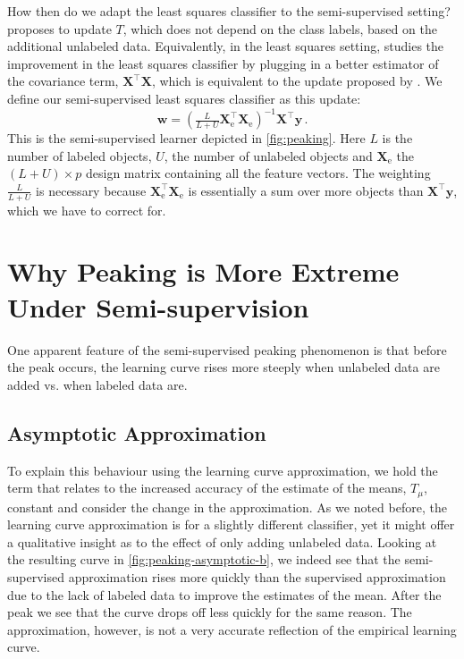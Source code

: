 \documentclass[twoside]{memoir}\usepackage[]{graphicx}\usepackage{xcolor}
\renewcommand{\vec}{\mathbf}
\begin{document}
How then do we adapt the least squares classifier to the semi-supervised setting? \citet{Fan2008} proposes to update $T$, which does not depend on the class labels, based on the additional unlabeled data. Equivalently, in the least squares setting, \citet{Shaffer1991} studies the improvement in the least squares classifier by plugging in a better estimator of the covariance term, $\mathbf{X}^\top \mathbf{X}$, which is equivalent to the update proposed by \citet{Fan2008}. We define our semi-supervised least squares classifier as this update:
\begin{equation}
\vec{w} = (\tfrac{L}{L+U} \mathbf{X}_\textrm{e}^\top \mathbf{X}_\textrm{e})^{-1} \mathbf{X}^\top \vec{y} \,. \label{eq:solutionsemisupervised}
\end{equation}
This is the semi-supervised learner depicted in \cref{fig:peaking}. Here $L$ is the number of labeled objects, $U$, the number of unlabeled objects and $\mathbf{X}_\textrm{e}$ the $(L+U) \times p$ design matrix containing all the feature vectors. The weighting $\tfrac{L}{L+U}$ is necessary because $\mathbf{X}_\textrm{e}^\top \mathbf{X}_\textrm{e}$ is essentially a sum over more objects than $\mathbf{X}^\top \vec{y}$, which we have to correct for.

\section{Why Peaking is More Extreme Under Semi-supervision} \label{section:incline}
One apparent feature of the semi-supervised peaking phenomenon is that before the peak occurs, the learning curve rises more steeply when unlabeled data are added vs. when labeled data are.

\subsection{Asymptotic Approximation} \label{section:inclineasymptotic}
To explain this behaviour using the learning curve approximation, we hold the term that relates to the increased accuracy of the estimate of the means, $T_\mu$, constant and consider the change in the approximation. As we noted before, the learning curve approximation is for a slightly different classifier, yet it might offer a qualitative insight as to the effect of only adding unlabeled data. Looking at the resulting curve in \cref{fig:peaking-asymptotic-b}, we indeed see that the semi-supervised approximation rises more quickly than the supervised approximation due to the lack of labeled data to improve the estimates of the mean. After the peak we see that the curve drops off less quickly for the same reason. The approximation, however, is not a very accurate reflection of the empirical learning curve.
\end{document}
